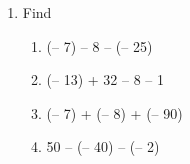 \documentclass[a4paper,leqno,12pt]{amsart}
\begin{document}
\begin{enumerate}
\item Find
\begin{enumerate}
\item (– 7) – 8 – (– 25)
\item (– 13) + 32 – 8 – 1
\item (– 7) + (– 8) + (– 90)
\item 50 – (– 40) – (– 2)
\end{enumerate}

\end{enumerate}


\end{document}
